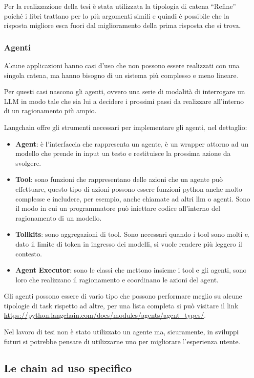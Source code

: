 Per la realizzazione della tesi è stata utilizzata la tipologia di catena ``Refine'' poiché i libri trattano per lo più argomenti simili e quindi è possibile che la risposta migliore esca fuori dal miglioramento della prima risposta che si trova.

\subsubsection*{Agenti}

Alcune applicazioni hanno casi d'uso che non possono essere realizzati con una singola catena, ma hanno bisogno di un sistema più complesso e meno lineare.

Per questi casi nascono gli agenti, ovvero una serie di modalità di interrogare un LLM in modo tale che sia lui a decidere i prossimi passi da realizzare all'interno di un ragionamento più ampio.

Langchain offre gli strumenti necessari per implementare gli agenti, nel dettaglio:

\begin{itemize}
    \item \textbf{Agent}: è l'interfaccia che rappresenta un agente, è un wrapper attorno ad un modello che prende in input un testo e restituisce la prossima azione da svolgere.
    \item \textbf{Tool}: sono funzioni che rappresentano delle azioni che un agente può effettuare, questo tipo di azioni possono essere funzioni python anche molto complesse e includere, per esempio, anche chiamate ad altri llm o agenti. Sono il modo in cui un programmatore può iniettare codice all'interno del ragionamento di un modello.
    \item \textbf{Tollkits}: sono aggregazioni di tool. Sono necessari quando i tool sono molti e, dato il limite di token in ingresso dei modelli, si vuole rendere più leggero il contesto.
    \item \textbf{Agent Executor}: sono le classi che mettono insieme i tool e gli agenti, sono loro che realizzano il ragionamento e coordinano le azioni del agent.
\end{itemize}

Gli agenti possono essere di vario tipo che possono performare meglio su alcune tipologie di task rispetto ad altre, per una lista completa si può visitare il link \url{https://python.langchain.com/docs/modules/agents/agent_types/}.

Nel lavoro di tesi non è stato utilizzato un agente ma, sicuramente, in sviluppi futuri si potrebbe pensare di utilizzarne uno per migliorare l'esperienza utente.

\subsection[Chain specifiche]{Le chain ad uso specifico}